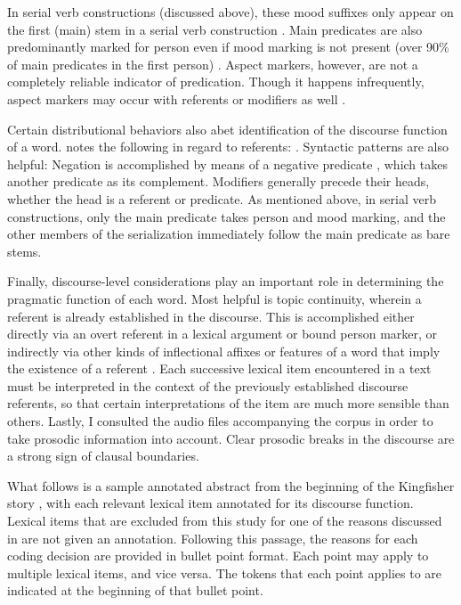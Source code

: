\noindent In serial verb constructions (discussed above), these mood suffixes only appear on the first (main) stem in a serial verb construction \parencite[42]{Nakayama2001}. Main predicates are also predominantly marked for person even if mood marking is not present (over 90\% of main predicates in the first person) \parencite[29]{Nakayama2001}. Aspect markers, however, are not a completely reliable indicator of predication. Though it happens infrequently, aspect markers may occur with referents or modifiers as well \parencite[47--50]{Nakayama2001}.

Certain distributional behaviors also abet identification of the discourse function of a word. \citeauthor{Nakayama2001} notes the following in regard to referents: . Syntactic patterns are also helpful: Negation is accomplished by means of a negative predicate , which takes another predicate as its complement. Modifiers generally precede their heads, whether the head is a referent or predicate. As mentioned above, in serial verb constructions, only the main predicate takes person and mood marking, and the other members of the serialization immediately follow the main predicate as bare stems.

Finally, discourse-level considerations play an important role in determining the pragmatic function of each word. Most helpful is topic continuity, wherein a referent is already established in the discourse. This is accomplished either directly via an overt referent in a lexical argument or bound person marker, or indirectly via other kinds of inflectional affixes or features of a word that imply the existence of a referent . Each successive lexical item encountered in a text must be interpreted in the context of the previously established discourse referents, so that certain interpretations of the item are much more sensible than others. Lastly, I consulted the audio files accompanying the corpus in order to take prosodic information into account. Clear prosodic breaks in the discourse are a strong sign of clausal boundaries.

What follows is a sample annotated abstract from the beginning of the Kingfisher story \parencite{Louie2003}, with each relevant lexical item annotated for its discourse function. Lexical items that are excluded from this study for one of the reasons discussed in  are not given an annotation. Following this passage, the reasons for each coding decision are provided in bullet point format. Each point may apply to multiple lexical items, and vice versa. The tokens that each point applies to are indicated at the beginning of that bullet point.

